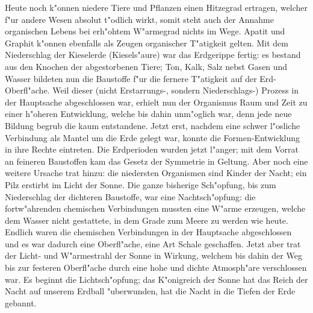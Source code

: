 \documentclass[a4paper, 11pt, oneside]{article}
\begin{document}
Heute noch k"onnen niedere Tiere und Pflanzen einen Hitzegrad ertragen, welcher f"ur andere Wesen absolut t"odlich wirkt, somit steht auch der Annahme organischen Lebens bei erh"ohtem W"armegrad nichts im Wege. Apatit und Graphit k"onnen ebenfalls als Zeugen organischer T"atigkeit gelten. Mit dem Niederschlag der Kieselerde (Kiesels"aure) war das Erdgerippe fertig: es bestand aus den Knochen der abgestorbenen Tiere; Ton, Kalk, Salz nebst Gasen und Wasser bildeten nun die Baustoffe f"ur die fernere T"atigkeit auf der Erd-Oberfl"ache. Weil dieser (nicht Erstarrungs-, sondern Niederschlags-) Prozess in der Hauptsache abgeschlossen war, erhielt nun der Organismus Raum und Zeit zu einer h"oheren Entwicklung, welche bis dahin unm"oglich war, denn jede neue Bildung begrub die kaum entstandene. Jetzt erst, nachdem eine schwer l"osliche Verbindung als Mantel um die Erde gelegt war, konnte die Formen-Entwicklung in ihre Rechte eintreten. Die Erdperioden wurden jetzt l"anger; mit dem Vorrat an feineren Baustoffen kam das Gesetz der Symmetrie in Geltung. Aber noch eine weitere Ursache trat hinzu: die niedersten Organismen sind Kinder der Nacht; ein Pilz erstirbt im Licht der Sonne. Die ganze bisherige Sch"opfung, bis zum Niederschlag der dichteren Baustoffe, war eine Nachtsch"opfung: die fortw"ahrenden chemischen Verbindungen mussten eine W"arme erzeugen, welche dem Wasser nicht gestattete, in dem Grade zum Meere zu werden wie heute. Endlich waren die chemischen Verbindungen in der Hauptsache abgeschlossen und es war dadurch eine Oberfl"ache, eine Art Schale geschaffen. Jetzt aber trat der Licht- und W"armestrahl der Sonne in Wirkung, welchem bis dahin der Weg bis zur festeren Oberfl"ache durch eine hohe und dichte Atmosph"are verschlossen war. Es beginnt die Lichtsch"opfung; das K"onigreich der Sonne hat das Reich der Nacht auf unserem Erdball "uberwunden, hat die Nacht in die Tiefen der Erde gebannt.
\end{document}
